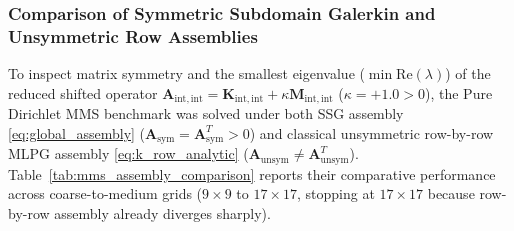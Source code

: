 \documentclass[VANCOUVER]{USG}
\begin{document}
\subsubsection{Comparison of Symmetric Subdomain Galerkin and Unsymmetric Row Assemblies}
\label{subsubsec:mms_assembly_comparison}

To inspect matrix symmetry and the smallest eigenvalue ($\min\mathrm{Re}(\lambda)$) of the reduced shifted operator $\mathbf{A}_{\mathrm{int},\mathrm{int}} = \mathbf{K}_{\mathrm{int},\mathrm{int}} + \kappa\mathbf{M}_{\mathrm{int},\mathrm{int}}$ ($\kappa = +1.0 > 0$), the Pure Dirichlet MMS benchmark was solved under both SSG assembly \eqref{eq:global_assembly} ($\mathbf{A}_{\mathrm{sym}} = \mathbf{A}_{\mathrm{sym}}^T > 0$) and classical unsymmetric row-by-row MLPG assembly \eqref{eq:k_row_analytic} ($\mathbf{A}_{\mathrm{unsym}} \ne \mathbf{A}_{\mathrm{unsym}}^T$). Table~\ref{tab:mms_assembly_comparison} reports their comparative performance across coarse-to-medium grids ($9 \times 9$ to $17 \times 17$, stopping at $17 \times 17$ because row-by-row assembly already diverges sharply).
\end{document}
